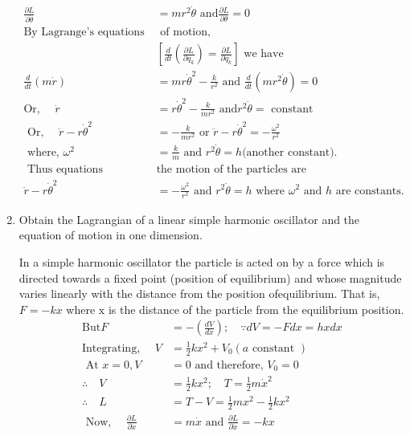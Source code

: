 \begin{enumerate}
\begin{answer}
\begin{align*}
		\frac{\partial L}{\partial \dot{\theta}}&=m r^{2} \dot{\theta}\text{ and} \frac{\partial L}{\partial \theta}=0\\
		\text{By Lagrange's equations }&\text{ of motion,}\\
		&\left[\frac{d}{d t}\left(\frac{\partial L}{\partial q_{k}}\right)=\frac{\partial L}{\partial q_{k}}\right]\text{ we have }\\
		\frac{d}{d t}(m \dot{r})&=m r \dot{\theta}^{2}-\frac{k}{r^{2}}\text{ and } \frac{d}{d t}\left(m r^{2} \dot{\theta}\right)=0\\
		\text{Or, }\quad \ddot{r}&=r \dot{\theta}^{2}-\frac{k}{m r^{2}}\text{ and} r^{2} \dot{\theta}=\text{ constant}\\
	\text{	Or, }\quad \ddot{r}-r \dot{\theta}^{2}&=-\frac{k}{m r^{2}}\text{ or }\ddot{r}-r \dot{\theta}^{2}=-\frac{\omega^{2}}{r^{2}}\\
\text{	where, }\omega^{2}&=\frac{k}{m}\text{ and }r^{2} \dot{\theta}=h \text{(another constant).}\\
\text{	Thus equations describing  }&\text{the motion of the particles are}\\ \ddot{r}-r \dot{\theta}^{2}&=-\frac{\omega^{2}}{r^{2}}\text{ and }r^{2} \dot{\theta}=h\text{ where }\omega^{2}\text{ and $h$ are constants.}
		\end{align*}
	\end{answer}
	\item Obtain the Lagrangian of a linear simple harmonic oscillator and the equation of motion in one dimension.
	\begin{answer}
		In a simple harmonic oscillator the particle is acted on by a force which is directed towards a fixed point (position of equilibrium) and whose magnitude varies linearly with the distance from the position ofequilibrium. That is, $F=-k x$ where $\mathrm{x}$ is the distance of the particle from the equilibrium position.
		\begin{align*}
		\text{But}
		F&=-\left(\frac{d V}{d x}\right) ; \quad \because d V=-F d x=h x d x\\
		\text{Integrating, }\quad V&=\frac{1}{2} k x^{2}+V_{0}(a\text{ constant })\\
	\text{	At }x=0, V&=0\text{ and therefore, }V_{0}=0\\
		\therefore \quad V&=\frac{1}{2} k x^{2} ; \quad T=\frac{1}{2} m \dot{x}^{2}\\
		\therefore \quad L&=T-V=\frac{1}{2} m x^{2}-\frac{1}{2} k x^{2}\\
	\text{	Now, }\quad \frac{\partial L}{\partial \dot{x}}&=m \dot{x}\text{ and } \frac{\partial L}{\partial \dot{x}}=-k x\\

\end{align*}
\end{answer}
\end{enumerate}
